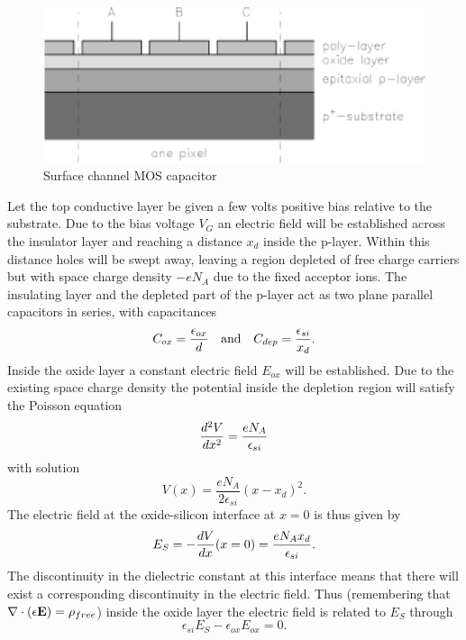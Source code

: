\documentclass{article}
\newcommand{\dd}[2]{{{d^2#1}\over{d#2^2}}}
\begin{document}
\begin{figure}[h]
  \centering
	\includegraphics{CCD_pMOS.eps}
  \caption{Surface channel MOS capacitor}
  \label{CCD.figpMOS}
\end{figure}

Let the top conductive layer be given a few volts positive bias
relative to the substrate. Due to the bias voltage $V_G$ an electric
field will be established across the insulator layer and reaching a
distance $x_d$ inside the p-layer. Within this distance holes will be
swept away, leaving a region depleted of free charge carriers but with
space charge density $-e N_A$ due to the fixed acceptor ions. The
insulating layer and the depleted part of the p-layer act as two plane
parallel capacitors in series, with capacitances
\begin{equation}
  C_{ox} = \frac{\epsilon_{ox}}{d}
  \quad {\rm and} \quad C_{dep} = \frac{\epsilon_{si}}{x_d}.
\end{equation}
Inside the oxide layer a constant electric field $E_{ox}$ will be
established. Due to the existing space charge density the potential
inside the depletion region will satisfy the Poisson equation
\begin{equation}
  \dd{V}{x} = \frac{e N_A}{\epsilon_{si}}
\end{equation}
with solution
\begin{equation}
  V(x) = \frac{e N_A}{2\epsilon_{si}} (x-x_d)^2.
\end{equation}
The electric field at the oxide-silicon interface at $x=0$ is thus
given by
\begin{equation}
  E_S = -{dV\over dx}(x=0) = \frac{e N_A x_d}{\epsilon_{si}}.
\end{equation}
The discontinuity in the dielectric constant at this interface means
that there will exist a corresponding discontinuity in the electric
field. Thus (remembering that $\nabla\cdot(\epsilon{\bf E})=\rho_{free}$) 
inside the oxide layer the electric field is related to
$E_S$ through
\begin{equation}
  \epsilon_{si} E_S - \epsilon_{ox} E_{ox} = 0.
  \label{CCD.divD}
\end{equation}
\end{document}
